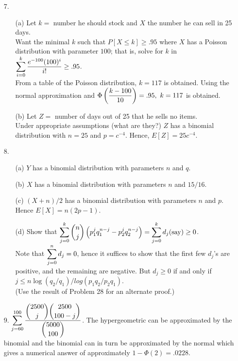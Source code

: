 \begin{enumerate}
	\item[7.] \begin{enumerate}
		\item[(a)] Let $k =$ number he should stock and $X$ the number he can sell in 25 days. \\
		Want the minimal $k$ such that $P[X\le k] \ge .95$ where $X$ has a Poisson distribution with parameter $100$; that is, solve for $k$ in $\displaystyle \sum_{i=0}^{k} \dfrac{e^{-100}(100)^i}{i!} \ge .95$. \\
		From a table of the Poisson distribution, $k=117$ is obtained.  Using the normal approximation and $\dsp \Phi\left(\dfrac{k-100}{10}\right) = .95,\ k=117$ is obtained.

		\item[(b)] Let $Z =$ number of days out of 25 that he sells no items. \\
		Under appropriate assumptions (what are they?) $Z$ has a binomial distribution with $n=25$ and $p=c^{-4}$.  Hence, $E[Z] = 25c^{-4}$.
	
	\end{enumerate}
	
	\item[8.] \begin{enumerate}
		\item[(a)] $Y$ has a binomial distribution with parameters $n$ and $q$.
		
		\item[(b)] $X$ has a binomial distribution with parameters $n$ and $15/16$.
		
		\item[(c)] $(X+n)/2$ has a binomial distribution with parameters $n$ and $p$. \\
		Hence $E[X] = n(2p-1)$.
		
		\item[(d)] Show that $\displaystyle \sum_{j=0}^{k} {n\choose j}\left(p_1^jq_1^{n-j} - p_2^jq_2^{n-j}\right) = \sum_{j=0}^{k}d_j(\text{say}) \ge 0$. \\
		Note that $\displaystyle \sum_{j=0}^{n} d_j =0$, hence it suffices to show that the first few $d_j$'s are positive, and the remaining are negative.  But $d_j \ge 0$ if and only if \\ $j\le n\log(q_2/q_1)/log(p_1q_2/p_2q_1)$. \\
		(Use the result of Problem 28 for an alternate proof.)
		
	\end{enumerate}
	
	\item[9.] $\displaystyle \sum_{j=60}^{100} \dfrac{\displaystyle {2500 \choose j}{2500 \choose {100-j}}}{\displaystyle {5000\choose 100}}$.  The hypergeometric can be approximated by the binomial and the binomial can in turn be approximated by the normal which gives a numerical answer of approximately $1- \Phi(2) = .0228$.
	

\end{enumerate}

